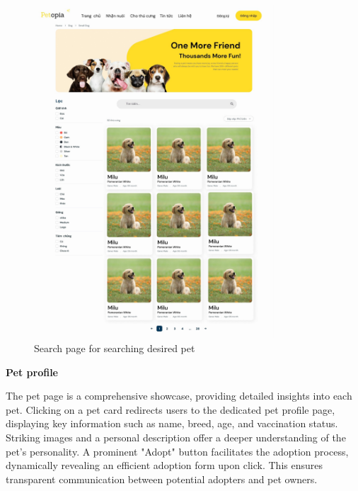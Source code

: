 \begin{figure}[H]
    \centering
    \includegraphics[width=0.8\textwidth]{Figures/search_ui.jpg}
    \caption{Search page for searching desired pet}
\end{figure}


\textbf{Pet profile}

The pet page is a comprehensive showcase, providing detailed insights into each pet. Clicking on a pet card redirects users to the dedicated pet profile page, displaying key information such as name, breed, age, and vaccination status. Striking images and a personal description offer a deeper understanding of the pet's personality. A prominent "Adopt" button facilitates the adoption process, dynamically revealing an efficient adoption form upon click. This ensures transparent communication between potential adopters and pet owners.

